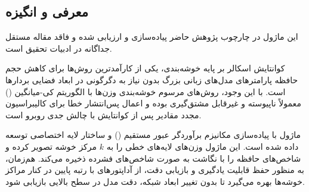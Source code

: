 \subsection{معرفی و انگیزه}
این ماژول در چارچوب پژوهش حاضر پیاده‌سازی و ارزیابی شده و فاقد مقاله مستقل جداگانه در ادبیات تحقیق است.

کوانتایش اسکالر بر پایه خوشه‌بندی، یکی از کارآمدترین روش‌ها برای کاهش حجم حافظه پارامترهای مدل‌های زبانی بزرگ بدون نیاز به دگرگونی در ابعاد فضایی بردارها است. با این وجود، روش‌های مرسوم خوشه‌بندی وزن‌ها با الگوریتم کی-میانگین () معمولاً ناپیوسته و غیرقابل مشتق‌گیری بوده و اعمال پس‌انتشار خطا برای کالیبراسیون مجدد مقادیر پس از کوانتایش با چالش جدی روبرو است.

ماژول  با پیاده‌سازی مکانیزم برآوردگر عبور مستقیم () و ساختار لایه اختصاصی  توسعه داده شده است. این ماژول وزن‌های لایه‌های خطی را به $k$ مرکز خوشه تصویر کرده و شاخص‌های حافظه را با نگاشت به صورت شاخص‌های فشرده ذخیره می‌کند. هم‌زمان، به منظور حفظ قابلیت یادگیری و بازیابی دقت، از آداپتورهای با رتبه پایین  در کنار مراکز خوشه‌ها بهره می‌گیرد تا بدون تغییر ابعاد شبکه، دقت مدل در سطح بالایی بازیابی شود.
